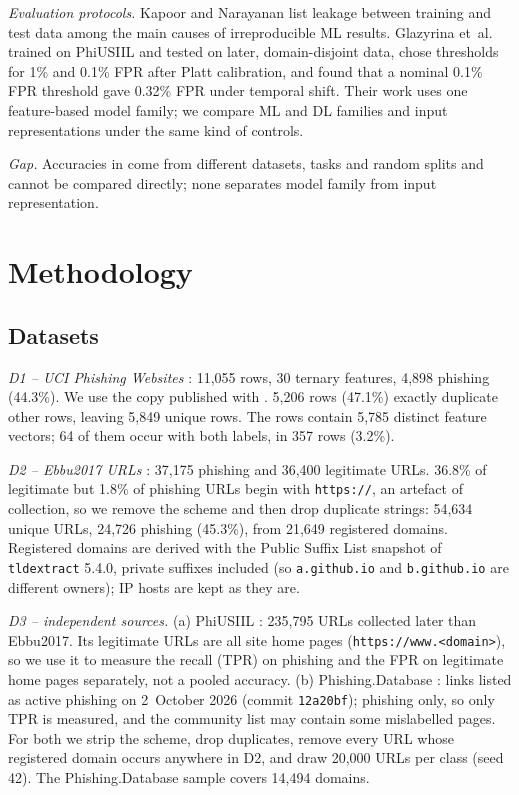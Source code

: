 \documentclass[conference]{IEEEtran}
\begin{document}
\emph{Evaluation protocols.} Kapoor and Narayanan \cite{kapoor2023} list leakage between training and test data among the main causes of irreproducible ML results. Glazyrina et~al. \cite{glazyrina2026} trained on PhiUSIIL \cite{prasad2024} and tested on later, domain-disjoint data, chose thresholds for 1\% and 0.1\% FPR after Platt calibration, and found that a nominal 0.1\% FPR threshold gave 0.32\% FPR under temporal shift. Their work uses one feature-based model family; we compare ML and DL families and input representations under the same kind of controls.

\emph{Gap.} Accuracies in \cite{shahrivari2020,yerima2020,blake2025,mendes2025} come from different datasets, tasks and random splits and cannot be compared directly; none separates model family from input representation.

\section{Methodology}\label{sec:method}

\subsection{Datasets}

\emph{D1 -- UCI Phishing Websites} \cite{uci2012}: 11,055 rows, 30 ternary features, 4,898 phishing (44.3\%). We use the copy published with \cite{shahrivari2020}. 5,206 rows (47.1\%) exactly duplicate other rows, leaving 5,849 unique rows. The rows contain 5,785 distinct feature vectors; 64 of them occur with both labels, in 357 rows (3.2\%).

\emph{D2 -- Ebbu2017 URLs} \cite{sahingoz2019}: 37,175 phishing and 36,400 legitimate URLs. 36.8\% of legitimate but 1.8\% of phishing URLs begin with \texttt{https://}, an artefact of collection, so we remove the scheme and then drop duplicate strings: 54,634 unique URLs, 24,726 phishing (45.3\%), from 21,649 registered domains. Registered domains are derived with the Public Suffix List snapshot of \texttt{tldextract} 5.4.0, private suffixes included (so \texttt{a.github.io} and \texttt{b.github.io} are different owners); IP hosts are kept as they are.

\emph{D3 -- independent sources.} (a) PhiUSIIL \cite{prasad2024}: 235,795 URLs collected later than Ebbu2017. Its legitimate URLs are all site home pages (\texttt{https://www.<domain>}), so we use it to measure the recall (TPR) on phishing and the FPR on legitimate home pages separately, not a pooled accuracy. (b) Phishing.Database \cite{phishdb2026}: links listed as active phishing on 2~October 2026 (commit \texttt{12a20bf}); phishing only, so only TPR is measured, and the community list may contain some mislabelled pages. For both we strip the scheme, drop duplicates, remove every URL whose registered domain occurs anywhere in D2, and draw 20,000 URLs per class (seed 42). The Phishing.Database sample covers 14,494 domains.
\end{document}
